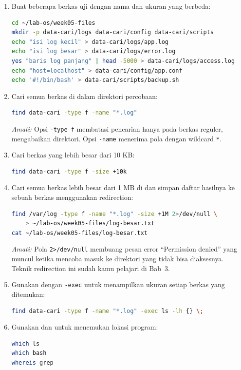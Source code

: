 \begin{enumerate}
    \item Buat beberapa berkas uji dengan nama dan ukuran yang berbeda:
\begin{lstlisting}[language=bash, caption={Membuat berkas uji untuk pencarian}]
cd ~/lab-os/week05-files
mkdir -p data-cari/logs data-cari/config data-cari/scripts
echo "isi log kecil" > data-cari/logs/app.log
echo "isi log besar" > data-cari/logs/error.log
yes "baris log panjang" | head -5000 > data-cari/logs/access.log
echo "host=localhost" > data-cari/config/app.conf
echo '#!/bin/bash' > data-cari/scripts/backup.sh
\end{lstlisting}

    \item Cari semua berkas  di dalam direktori percobaan:
\begin{lstlisting}[language=bash, caption={Mencari berkas berdasarkan nama}]
find data-cari -type f -name "*.log"
\end{lstlisting}
    \textit{Amati:} Opsi \texttt{-type f} membatasi pencarian hanya pada berkas reguler, mengabaikan direktori. Opsi \texttt{-name} menerima pola dengan wildcard \texttt{*}.

    \item Cari berkas yang lebih besar dari 10 KB:
\begin{lstlisting}[language=bash, caption={Mencari berkas berdasarkan ukuran}]
find data-cari -type f -size +10k
\end{lstlisting}

    \item Cari semua berkas  lebih besar dari 1 MB di 
    dan simpan daftar hasilnya ke sebuah berkas menggunakan redirection:
\begin{lstlisting}[language=bash, caption={Mencari log besar dan menyimpan hasil}]
find /var/log -type f -name "*.log" -size +1M 2>/dev/null \
    > ~/lab-os/week05-files/log-besar.txt
cat ~/lab-os/week05-files/log-besar.txt
\end{lstlisting}
    \textit{Amati:} Pola \texttt{2>/dev/null} membuang pesan error ``Permission denied'' yang muncul ketika  mencoba masuk ke direktori yang tidak bisa diaksesnya. Teknik redirection ini sudah kamu pelajari di Bab~3.

    \item Gunakan  dengan \texttt{-exec} untuk menampilkan ukuran setiap berkas yang ditemukan:
\begin{lstlisting}[language=bash, caption={Menjalankan perintah pada setiap berkas yang ditemukan}]
find data-cari -type f -name "*.log" -exec ls -lh {} \;
\end{lstlisting}

    \item Gunakan  dan  untuk menemukan lokasi program:
\begin{lstlisting}[language=bash, caption={Menemukan lokasi program}]
which ls
which bash
whereis grep
\end{lstlisting}
\end{enumerate}

